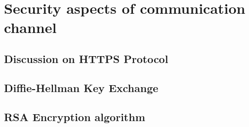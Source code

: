 \chapter{Security aspects of communication channel}\label{ch:security-aspects-of-communication-channel}


\section{Discussion on HTTPS Protocol}\label{sec:discussion-on-https-protocol}



\section{Diffie-Hellman Key Exchange}\label{sec:diffie-hellman-key-exchange}


\section{RSA Encryption algorithm}\label{sec:rsa-encryption-algorithm2}
